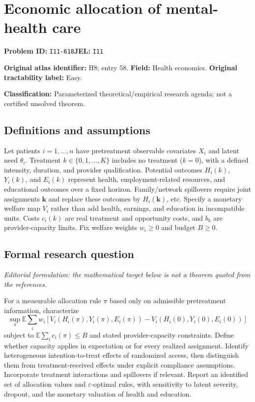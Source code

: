 \documentclass[11pt,a4paper]{article}
\begin{document}
\section*{Economic allocation of mental-health care}
\textbf{Problem ID:} \texttt{I11-618}\quad \textbf{JEL:} \texttt{I11}\par
\label{problem:OP-0058}
\label{atlas:prob:H8}
\noindent\textbf{Original atlas identifier:} H8; entry 58. \textbf{Field:} Health economics. \textbf{Original tractability label:} Easy.

\noindent\textbf{Classification:} Parameterized theoretical/empirical research agenda; not a certified unsolved theorem.

\subsection*{Definitions and assumptions}
Let patients $i=1,\ldots,n$ have pretreatment observable covariates $X_i$ and latent need $\theta_i$. Treatment $k\in\{0,1,\ldots,K\}$ includes no treatment ($k=0$), with a defined intensity, duration, and provider qualification. Potential outcomes $H_i(k)$, $Y_i(k)$, and $E_i(k)$ represent health, employment-related resources, and educational outcomes over a fixed horizon. Family/network spillovers require joint assignments $\mathbf k$ and replace these outcomes by $H_i(\mathbf k)$, etc. Specify a monetary welfare map $V_i$ rather than add health, earnings, and education in incompatible units. Costs $c_i(k)$ are real treatment and opportunity costs, and $b_k$ are provider-capacity limits. Fix welfare weights $w_i\geq0$ and budget $B\geq0$.

\subsection*{Formal research question}
\emph{Editorial formulation: the mathematical target below is not a theorem quoted from the references.}

For a measurable allocation rule $\pi$ based only on admissible pretreatment information, characterize
\[
 \sup_{\pi}\mathbb E\sum_iw_i\left[V_i(H_i(\pi),Y_i(\pi),E_i(\pi))-V_i(H_i(0),Y_i(0),E_i(0))\right]
\]
subject to $\mathbb E\sum_ic_i(\pi)\leq B$ and stated provider-capacity constraints. Define whether capacity applies in expectation or for every realized assignment. Identify heterogeneous intention-to-treat effects of randomized access, then distinguish them from treatment-received effects under explicit compliance assumptions. Incorporate treatment interactions and spillovers if relevant. Report an identified set of allocation values and $\varepsilon$-optimal rules, with sensitivity to latent severity, dropout, and the monetary valuation of health and education.
\end{document}
